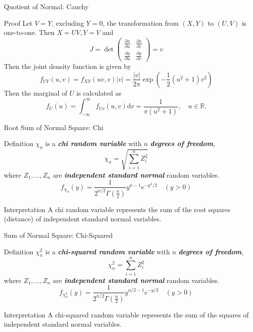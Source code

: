\documentclass{beamer}
\newcommand{\bb}[1]{\textcolor{antiquefuchsia}{\textbf{\textit{#1}}}}
\begin{document}
\begin{frame}{Quotient of Normal: Cauchy}
\begin{block}{Proof}
Let $V=Y$, excluding $Y=0$, the transformation from $(X, Y)$ to $(U, V)$ is one-to-one. Then $X=U V, Y=V$ and
$$
J=\operatorname{det}\left(\begin{array}{ll}
\frac{\partial x}{\partial u} & \frac{\partial x}{\partial v} \\
\frac{\partial y}{\partial u} & \frac{\partial y}{\partial v}
\end{array}\right)=v
$$
Then the joint density function is given by
$$
f_{U V}(u, v)=f_{X Y}(u v, v)|v|=\frac{|v|}{2 \pi} \exp \left(-\frac{1}{2}\left(u^{2}+1\right) v^{2}\right)
$$
Then the marginal of $U$ is calculated as
$$
f_{U}(u)=\int_{-\infty}^{\infty} f_{U v}(u, v) \mathrm{d} v=\frac{1}{\pi\left(u^{2}+1\right)}, \quad u \in \mathbb{R} .
$$
\end{block}
\end{frame}

\begin{frame}{Root Sum of Normal Square: Chi}
\begin{block}{Definition}
$\chi_{n}$ is a \bb{chi random variable} with $n$ \bb{degrees of freedom},
$$
\chi_{n}=\sqrt{\sum_{i=1}^{n} Z_{i}^{2}}
$$
where $Z_{1}, \ldots, Z_{n}$ are \bb{independent standard normal} random variables. 
$$f_{\chi_{n}}(y)=\frac{1}{2^{n / 2} \Gamma\left(\frac{n}{2}\right)} y^{n-1} e^{-y^2 / 2}\quad (y>0)$$
\end{block}

\begin{block}{Interpretation}
A chi random variable represents the sum of the root squares (distance) of independent standard normal variables.
\end{block}
\end{frame}



\begin{frame}{Sum of Normal Square: Chi-Squared}
\begin{block}{Definition}
$\chi_{n}^2$ is a \bb{chi-squared random variable} with $n$ \bb{degrees of freedom},
$$
\chi_{n}^{2}=\sum_{i=1}^{n} Z_{i}^{2}
$$
where $Z_{1}, \ldots, Z_{n}$ are \bb{independent standard normal} random variables. 
$$f_{\chi_{n}^{2}}(y)=\frac{1}{2^{n / 2} \Gamma\left(\frac{n}{2}\right)} y^{n / 2-1} e^{-y / 2}\quad (y>0)$$
\end{block}

\begin{block}{Interpretation}
A chi-squared random variable represents the sum of the squares of independent standard normal variables.
\end{block}
\end{frame}
\end{document}
